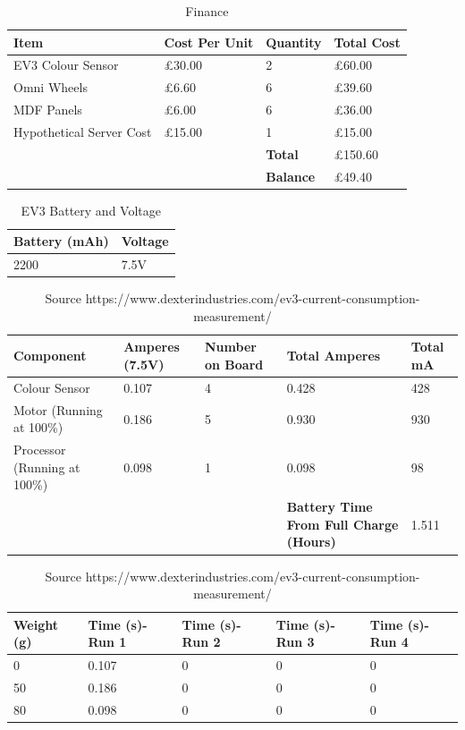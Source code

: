 \documentclass[a4paper]{article}
\begin{document}
\begin{center}
\begin{table}[!htb]
\centering
\begin{tabular}{| p{2cm} | p{2cm} | p{2cm} | p{2cm} |}
\hline
\textbf{Item} & \textbf{Cost Per Unit} & \textbf{Quantity} & \textbf{Total Cost} \\
\hline
EV3 Colour Sensor & £30.00 & 2 & £60.00 \\
\hline
Omni Wheels & £6.60 & 6 & £39.60 \\
\hline
MDF Panels & £6.00 & 6 & £36.00 \\
\hline
Hypothetical Server Cost & £15.00 & 1 & £15.00 \\ 
\hline
 &  & \textbf{Total} & £150.60 \\ 
\hline
 &  & \textbf{Balance} & £49.40 \\
\hline
\end{tabular}
\caption{Finance}
\end{table}


\begin{table}[!htb]
\centering
\begin{tabular}{| p{2cm} | p{2cm} |}
\hline
\textbf{Battery (mAh)} & \textbf{Voltage} \\
\hline
2200 & 7.5V \\
\hline
\end{tabular}
\caption{EV3 Battery and Voltage}
\end{table}

\begin{table}[!htb]
\centering
\begin{tabular}{| p{2.2cm} | p{2cm} | p{2.2cm} | p{2cm} | p{2cm} |}
\hline
\textbf{Component} & \textbf{Amperes (7.5V)} & \textbf{Number on Board} & \textbf{Total Amperes} & \textbf{Total mA}\\
\hline
Colour Sensor & 0.107 & 4 & 0.428 & 428 \\
\hline
Motor (Running at 100\%) & 0.186 & 5 & 0.930 & 930 \\
\hline 
Processor (Running at 100\%) & 0.098 & 1 & 0.098 & 98 \\
\hline
 & & & \textbf{Battery Time From Full Charge (Hours)} & 1.511 \\ 
 \hline
\end{tabular}
\caption{Source https://www.dexterindustries.com/ev3-current-consumption-measurement/}
\end{table}

\begin{table}[!htb]
\centering
\begin{tabular}{| p{2cm} | p{2cm} | p{2cm} | p{2cm} | p{2cm} |}
\hline
\textbf{Weight (g)} & \textbf{Time (s)-Run 1} & \textbf{Time (s)-Run 2} & \textbf{Time (s)-Run 3} & \textbf{Time (s)-Run 4} \\
\hline
0 & 0.107 & 0 & 0 & 0 \\
\hline
50 & 0.186 & 0 & 0 & 0 \\
\hline 
80 & 0.098 & 0 & 0 & 0 \\
 \hline
\end{tabular}
\caption{Source https://www.dexterindustries.com/ev3-current-consumption-measurement/}
\end{table}

\end{center}
  
\end{document}
